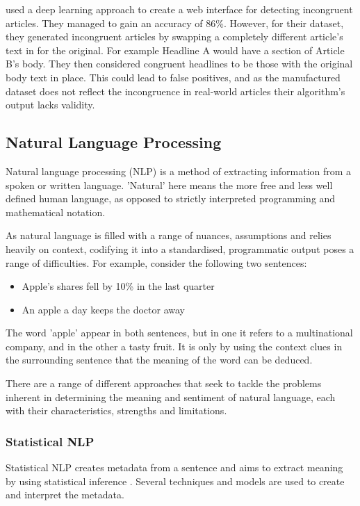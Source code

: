  used a deep learning approach to create a web interface for detecting incongruent articles. They managed to gain an accuracy of 86\%. However, for their dataset, they generated incongruent articles by swapping a completely different article's text in for the original. For example Headline A would have a section of Article B's body. They then considered congruent headlines to be those with the original body text in place. This could lead to false positives, and as the manufactured dataset does not reflect the incongruence in real-world articles their algorithm's output lacks validity.

\subsection{Natural Language Processing}
Natural language processing (NLP) is a method of extracting information from a spoken or written language. 'Natural' here means the more free and less well defined human language, as opposed to strictly interpreted programming and mathematical notation. \cite{jackson2002}

 As natural language is filled with a range of nuances, assumptions and relies heavily on context, codifying it into a standardised, programmatic output poses a range of difficulties. For example, consider the following two sentences:

\begin{itemize}
	\item Apple's shares fell by 10\% in the last quarter
	\item An apple a day keeps the doctor away
\end{itemize}

The word 'apple' appear in both sentences, but in one it refers to a multinational company, and in the other a tasty fruit. It is only by using the context clues in the surrounding sentence that the meaning of the word can be deduced.

There are a range of different approaches that seek to tackle the problems inherent in determining the meaning and sentiment of natural language, each with their  characteristics, strengths and limitations. 

\subsubsection{Statistical NLP}
Statistical NLP creates metadata from a sentence and aims to extract meaning by using statistical inference \cite{manning1999}. Several techniques and models are used to create and interpret the metadata.

